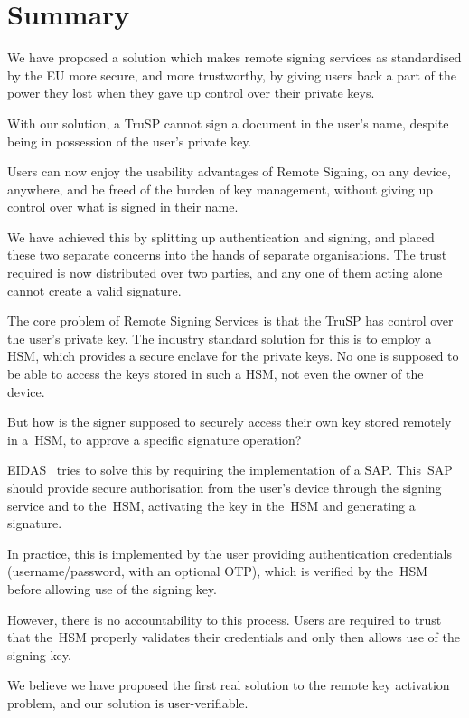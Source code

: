 \chapter*{Summary}
We have proposed a solution which makes remote signing services as standardised by the \gls{EU} more secure,
and more trustworthy,
by giving users back a part of the power they lost when they gave up control over their private keys.

With our solution,
a \gls{TruSP} cannot sign a document in the user's name,
despite being in possession of the user's private key.

Users can now enjoy the usability advantages of Remote Signing,
on any device, anywhere,
and be freed of the burden of key management,
without giving up control over what is signed in their name.

We have achieved this by splitting up authentication and signing,
and placed these two separate concerns into the hands of separate organisations.
The trust required is now distributed over two parties,
and any one of them acting alone cannot create a valid signature.

The core problem of Remote Signing Services is that the \gls{TruSP} has control over the user's private key.
The industry standard solution for this is to employ a \gls{HSM},
which provides a secure enclave for the private keys.
No one is supposed to be able to access the keys stored in such a \gls{HSM},
not even the owner of the device.

But how is the signer supposed to securely access their own key stored remotely in a~\gls{HSM},
to approve a specific signature operation?

EIDAS~\cite{eidas} tries to solve this by requiring the implementation of a \gls{SAP}.
This~\gls{SAP} should provide secure authorisation from the user's device through the signing service and to the~\gls{HSM},
activating the key in the~\gls{HSM} and generating a signature.

In practice,
this is implemented by the user providing authentication credentials (username/password, with an optional \gls{OTP}),
which is verified by the~\gls{HSM} before allowing use of the signing key.

However, there is no accountability to this process.
Users are required to trust that the~\gls{HSM} properly validates their credentials and only then
allows use of the signing key.

We believe we have proposed the first real solution to the remote key activation problem,
and our solution is user-verifiable.

